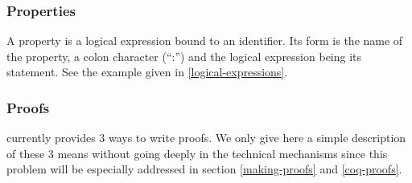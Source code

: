 \subsubsection{Properties}
A property is  a logical expression bound to an identifier. Its
form is the name of the property, a colon character (``:'') and the
logical expression being its statement. See the example given in
\ref{logical-expressions}.
\begin{syn}
 \is
    \tok{:} 
\end{syn}





\subsubsection{Proofs}
\label{proof-short-intro}
{\focal} currently provides 3 ways to write proofs. We only give here a
simple description of these 3 means without going deeply in the
technical mechanisms since this problem will be especially addressed
in section \ref{making-proofs} and \ref{coq-proofs}. %

